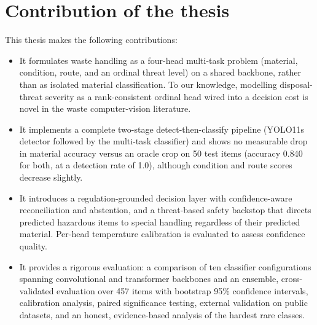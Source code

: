 \section{Contribution of the thesis}
This thesis makes the following contributions:
\begin{itemize}
    \item It formulates waste handling as a four-head multi-task problem (material, condition, route, and an ordinal threat level) on a shared backbone, rather than as isolated material classification. To our knowledge, modelling disposal-threat severity as a rank-consistent ordinal head wired into a decision cost is novel in the waste computer-vision literature.

    \item It implements a complete two-stage detect-then-classify pipeline (YOLO11s detector followed by the multi-task classifier) and shows no measurable drop in material accuracy versus an oracle crop on 50 test items (accuracy 0.840 for both, at a detection rate of 1.0), although condition and route scores decrease slightly.

    \item It introduces a regulation-grounded decision layer with confidence-aware reconciliation and abstention, and a threat-based safety backstop that directs predicted hazardous items to special handling regardless of their predicted material. Per-head temperature calibration is evaluated to assess confidence quality.

    \item It provides a rigorous evaluation: a comparison of ten classifier configurations spanning convolutional and transformer backbones and an ensemble, cross-validated evaluation over 457 items with bootstrap 95\% confidence intervals, calibration analysis, paired significance testing, external validation on public datasets, and an honest, evidence-based analysis of the hardest rare classes.
\end{itemize}

